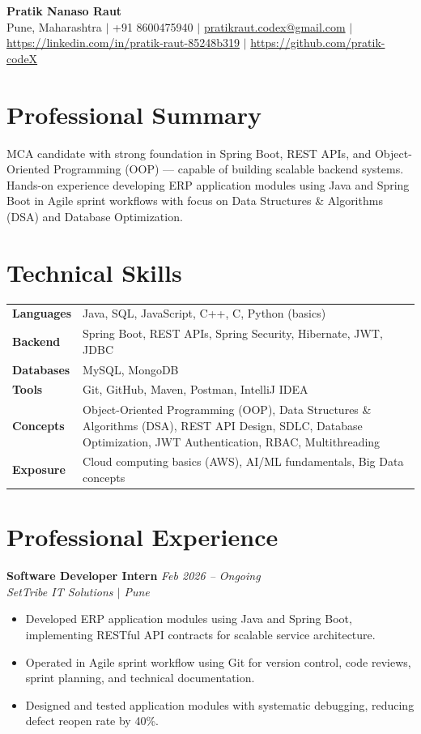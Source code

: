 \documentclass[10.5pt,a4paper]{article}
\begin{document}
\begin{center}
{\Large\bfseries Pratik Nanaso Raut}\\[2pt]
Pune, Maharashtra $|$ +91 8600475940 $|$ \href{mailto:pratikraut.codex@gmail.com}{pratikraut.codex@gmail.com} $|$ \href{https://linkedin.com/in/pratik-raut-85248b319}{https://linkedin.com/in/pratik-raut-85248b319} $|$ \href{https://github.com/pratik-codeX}{https://github.com/pratik-codeX}
\end{center}
\vspace{-2pt}
\section{Professional Summary}
MCA candidate with strong foundation in Spring Boot, REST APIs, and Object-Oriented Programming (OOP) — capable of building scalable backend systems.\\[2pt]
Hands-on experience developing ERP application modules using Java and Spring Boot in Agile sprint workflows with focus on Data Structures \& Algorithms (DSA) and Database Optimization.
\section{Technical Skills}
\begin{tabular}{@{}p{}p{}@{}}
\textbf{Languages} & Java, SQL, JavaScript, C++, C, Python (basics) \\[1pt]
\textbf{Backend} & Spring Boot, REST APIs, Spring Security, Hibernate, JWT, JDBC \\[1pt]
\textbf{Databases} & MySQL, MongoDB \\[1pt]
\textbf{Tools} & Git, GitHub, Maven, Postman, IntelliJ IDEA \\[1pt]
\textbf{Concepts} & Object-Oriented Programming (OOP), Data Structures \& Algorithms (DSA), REST API Design, SDLC, Database Optimization, JWT Authentication, RBAC, Multithreading \\[1pt]
\textbf{Exposure} & Cloud computing basics (AWS), AI/ML fundamentals, Big Data concepts \\
\end{tabular}
\section{Professional Experience}
\textbf{Software Developer Intern} \hfill \textit{Feb 2026 -- Ongoing}
\\\textit{SetTribe IT Solutions $|$ Pune}
\begin{itemize}
  \item Developed ERP application modules using Java and Spring Boot, implementing RESTful API contracts for scalable service architecture.
  \item Operated in Agile sprint workflow using Git for version control, code reviews, sprint planning, and technical documentation.
  \item Designed and tested application modules with systematic debugging, reducing defect reopen rate by 40\%.
\end{itemize}
\end{document}
